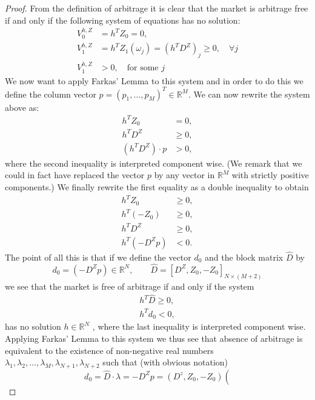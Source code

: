 \begin{proof}
    From the definition of arbitrage it is clear that the market is arbitrage free if and only if the following system of equations has no solution:
    \begin{align*}
        V_0^{h,Z} &= h^TZ_0 = 0, \\
        V_1^{h,Z} &= h^TZ_1(\omega_j)=(h^TD^Z)_j \ge0, \quad\forall j \\
        V_1^{h,Z} &>0, \quad\mbox{for some } j
    \end{align*}
    We now want to apply Farkas’ Lemma to this system and in order to do this we define the column vector $p=(p_1,\dots,p_M)^T\in\mathbb{R}^M$. We can now rewrite the system above as:
    \begin{align*}
        h^TZ_0 &= 0,\\
        h^TD^Z &\ge 0, \\
        (h^TD^Z)\cdot p &> 0,
    \end{align*}
    where the second inequality is interpreted component wise. (We remark that we could in fact have replaced the vector $p$ by any vector in $\mathbb{R}^M$ with strictly positive components.) We finally rewrite the first equality as a double inequality to obtain
    \begin{align*}
        h^TZ_0 &\ge 0,\\
        h^T(-Z_0) &\ge 0, \\
        h^TD^Z &\ge 0, \\
        h^T(-D^Zp) & < 0.
    \end{align*}
    The point of all this is that if we define the vector $d_0$ and the block matrix $\hat{D}$ by
    \begin{equation*}
        d_0=(-D^Zp)\in\mathbb{R}^N, \qquad \hat{D}=[D^Z,Z_0,-Z_0]_{N\times (M+2)}
    \end{equation*}
    we see that the market is free of arbitrage if and only if the system
    \begin{align*}
        h^T\hat{D} \ge 0,\\
        h^Td_0 < 0,
    \end{align*}
    has no solution $h\in\mathbb{R}^N$ , where the last inequality is interpreted component wise. Applying Farkas’ Lemma to this system we thus see that absence of arbitrage is equivalent to the existence of non-negative real numbers $\lambda_1, \lambda_2,\dots,\lambda_M, \lambda_{N+1}, \lambda_{N+2}$ such that (with obvious notation)
    \begin{equation*}
        d_0=\hat{D}\cdot\lambda = -D^Zp=(D^z, Z_0, -Z_0)\left(

\end{equation*}
\end{proof}
